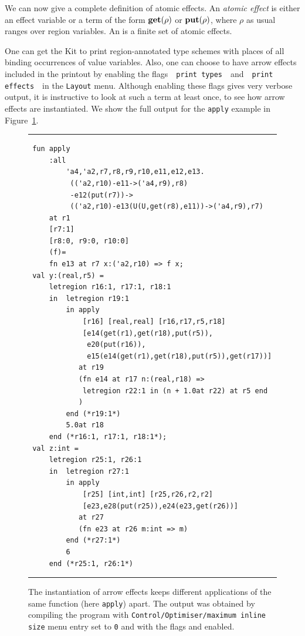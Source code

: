 \documentclass[12pt]{book}
\begin{document}
We can now give a complete definition of atomic effects. 
An 
%
{\em atomic effect\/} is either an effect
variable or a term of the form $\mathop{\bf get}\nolimits(\rho)$ or $\mathop{\bf put}\nolimits(\rho)$, where $\rho$ as usual ranges over region
variables. An  is a finite set of atomic effects.

One can get the Kit to print region-annotated 
%
%
type schemes with places of all binding occurrences of value variables.  Also, one can 
choose to have arrow effects included in the printout by enabling 
the flags~~\texttt{print types}~~and~~\texttt{print effects}~~in the 
\texttt{Layout} menu. Although enabling these flags gives very 
verbose output, it is instructive to look at such a term at least once, to 
see how arrow effects are instantiated. We show the full output for 
the {\tt apply} example in Figure~\ref{apply.fig}. 

\begin{figure}
\hrule \medskip
\begin{verbatim} 
 fun apply 
     :all 
         'a4,'a2,r7,r8,r9,r10,e11,e12,e13.
          (('a2,r10)-e11->('a4,r9),r8)
          -e12(put(r7))->
          (('a2,r10)-e13(U(U,get(r8),e11))->('a4,r9),r7) 
     at r1 
     [r7:1] 
     [r8:0, r9:0, r10:0] 
     (f)= 
     fn e13 at r7 x:('a2,r10) => f x; 
 val y:(real,r5) = 
     letregion r16:1, r17:1, r18:1 
     in  letregion r19:1 
         in apply
             [r16] [real,real] [r16,r17,r5,r18] 
             [e14(get(r1),get(r18),put(r5)),
              e20(put(r16)),
              e15(e14(get(r1),get(r18),put(r5)),get(r17))]
            at r19 
            (fn e14 at r17 n:(real,r18) => 
             letregion r22:1 in (n + 1.0at r22) at r5 end
            ) 
         end (*r19:1*) 
         5.0at r18 
     end (*r16:1, r17:1, r18:1*); 
 val z:int = 
     letregion r25:1, r26:1 
     in  letregion r27:1 
         in apply
             [r25] [int,int] [r25,r26,r2,r2] 
             [e23,e28(put(r25)),e24(e23,get(r26))]
            at r27 
            (fn e23 at r26 m:int => m) 
         end (*r27:1*) 
         6 
     end (*r25:1, r26:1*)
\end{verbatim}
\caption{The instantiation of arrow effects keeps different applications of
  the same function (here {\tt apply}) apart. The output
  was obtained by compiling the program  with
  {\tt Control/Optimiser/maximum inline size} menu entry set to {\tt 0} and with the flags  and
   enabled.}  \medskip \hrule
\label{apply.fig}
\end{figure}
\end{document}
